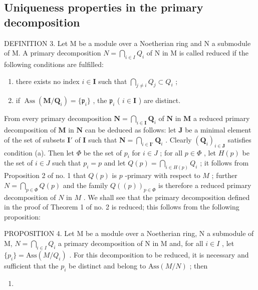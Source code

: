 \subsection{Uniqueness properties in the primary decomposition}

DEFINITION 3. Let M be a module over a Noetherian ring and N a submodule of M. A primary decomposition \(N = \bigcap_{i \in I} Q_i\) of N in M is called reduced if the following conditions are fulfilled:

\begin{enumerate}
\def\labelenumi{(\alph{enumi})}
\item
  there exists no index \(i \in \mathbf{I}\) such that \(\bigcap_{j \neq i} Q_j \subset Q_i\) ;
\item
  if \(\operatorname{Ass}(\mathbf{M} / \mathbf{Q}_i) = \{\mathfrak{p}_i\}\) , the \(\mathfrak{p}_i\) ( \(i \in \mathbf{I}\) ) are distinct.
\end{enumerate}

From every primary decomposition \(\mathbf{N} = \bigcap_{i\in \mathbf{I}}\mathbf{Q}_i\) of \(\mathbf{N}\) in \(\mathbf{M}\) a reduced primary decomposition of \(\mathbf{M}\) in \(\mathbf{N}\) can be deduced as follows: let \(\mathbf{J}\) be a minimal element of the set of subsets \(\mathbf{I}'\) of \(\mathbf{I}\) such that \(\mathbf{N} = \bigcap_{i\in \mathbf{I}'}\mathbf{Q}_i\) . Clearly \((\mathbf{Q}_i)_{i\in \mathbf{J}}\) satisfies condition (a). Then let \(\Phi\) be the set of \(p_i\) for \(i\in J\) ; for all \(p\in \Phi\) , let \(H(p)\) be the set of \(i\in J\) such that \(p_i = p\) and let \(Q(p) = \bigcap_{i\in H(p)}Q_i\) ; it follows from Proposition 2 of no. 1 that \(Q(p)\) is \(p\) -primary with respect to \(M\) ; further \(N = \bigcap_{p\in \Phi}Q(p)\) and the family \(Q((p))_{p\in \Phi}\) is therefore a reduced primary decomposition of \(N\) in \(M\) . We shall see that the primary decomposition defined in the proof of Theorem 1 of no. 2 is reduced; this follows from the following proposition:

PROPOSITION 4. Let M be a module over a Noetherian ring, N a submodule of M, \(N = \bigcap_{i \in I} Q_i\) a primary decomposition of N in M and, for all \(i \in I\) , let \(\{p_i\} = \text{Ass}(M/Q_i)\) . For this decomposition to be reduced, it is necessary and sufficient that the \(p_i\) be distinct and belong to \(\text{Ass}(M/N)\) ; then

\begin{enumerate}
\def\labelenumi{(\arabic{enumi})}
\setcounter{enumi}{1}
\tightlist
\item
\end{enumerate}

